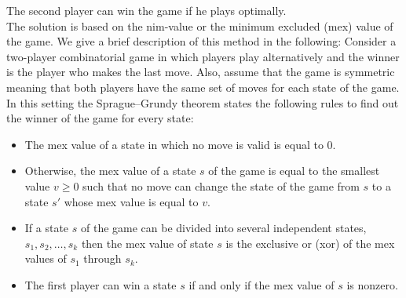 \begin{solution}
The second player can win the game if he plays optimally.\\[0.2cm]

The solution is based on the nim-value or the minimum excluded (mex) value of the game. We give a brief description of this method in the following: Consider a two-player combinatorial game in which players play alternatively and the winner is the player who makes the last move. Also, assume that the game is symmetric meaning that both players have the same set of moves for each state of the game. In this setting the Sprague–Grundy theorem states the following rules to find out the winner of the game for every state:
\begin{itemize}
	\item The mex value of a state in which no move is valid is equal to 0.
	\item Otherwise, the mex value of a state $s$ of the game is equal to the smallest value $v \geq 0$ such that no move can change the state of the game from $s$ to a state $s'$ whose mex value is equal to $v$.
	\item If a state $s$ of the game can be divided into several independent states, $s_1, s_2, \ldots, s_k$ then the mex value of state $s$ is the exclusive or (xor) of the mex values of $s_1$ through $s_k$.
	\item The first player can win a state $s$ if and only if the mex value of $s$ is nonzero.
\end{itemize}


\end{solution}
